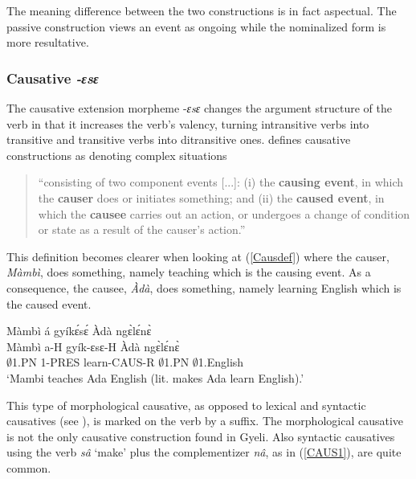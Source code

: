 \noindent The meaning difference between the two constructions is in fact aspectual. The passive construction views an event as ongoing while the nominalized form is more resultative.%


\subsubsection{Causative \textit{-ɛsɛ}}
\label{sec:CAU} 

The causative extension morpheme -{\itshape ɛsɛ} changes the argument structure of the verb in that it increases the verb's valency, turning intransitive verbs into transitive and transitive verbs into ditransitive ones. \citet{song2013} defines causative constructions as denoting complex situations
\begin{quote}
``consisting of two component events [...]: (i) the {\bfseries causing event}, in which the {\bfseries causer} does or initiates something; and (ii) the {\bfseries caused event}, in which the {\bfseries causee} carries out an action, or undergoes a change of condition or state as a result of the causer’s action.''
\end{quote}
This definition becomes clearer when looking at (\ref{Causdef}) where the causer, {\itshape Màmbì}, does something, namely teaching which is the causing event. As a consequence, the causee, {\itshape Àdà}, does something, namely learning English which is the caused event.

\begin{exe}
\ex\label{Causdef}
 \glll Màmbì á gyíkɛ́sɛ́ Àdà ngɛ̀lɛ́nɛ̀  \\
	Màmbì a-H gyík-ɛsɛ-H Àdà ngɛ̀lɛ́nɛ̀ \\
         $\emptyset$1.PN 1-PRES learn-CAUS-R $\emptyset$1.PN $\emptyset$1.English  \\
    \trans `Mambi teaches Ada English (lit. makes Ada learn English).'
\end {exe}

This type of morphological causative, as opposed to lexical and syntactic causatives (see \citet[3]{song96}), is marked on the verb by a suffix. The morphological causative is not the only causative construction found in Gyeli. Also syntactic causatives using the verb {\itshape sâ} `make' plus the complementizer {\itshape nâ}, as in (\ref{CAUS1}), are quite common.

